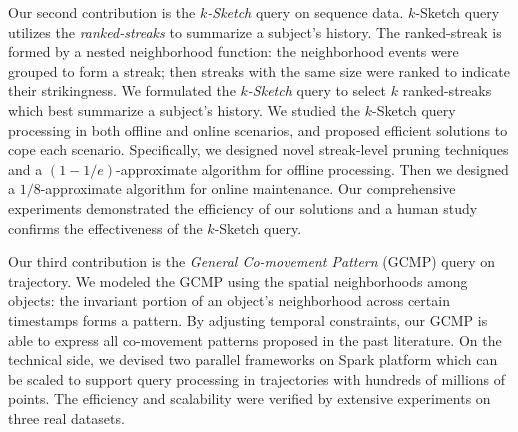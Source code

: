 Our second contribution is the \emph{$k$-Sketch} query on sequence data.
$k$-Sketch query utilizes the \emph{ranked-streaks} to
summarize a subject's history.
The ranked-streak is formed
by a nested neighborhood function: the neighborhood events were grouped to form a streak; then streaks with the same size were ranked to indicate their strikingness.
%
We formulated the \emph{$k$-Sketch} query to select $k$ ranked-streaks which best summarize a subject's history.
We studied the $k$-Sketch query processing in both offline and online scenarios,
and proposed efficient solutions to cope each scenario. Specifically, we designed novel streak-level pruning techniques and a $(1-1/e)$-approximate algorithm for offline processing. Then we designed a $1/8$-approximate algorithm for online maintenance.
Our comprehensive experiments demonstrated the efficiency of our solutions and a human study confirms the effectiveness of the $k$-Sketch query.


Our third contribution is the \emph{General Co-movement Pattern} (GCMP) query on trajectory.
We modeled the GCMP using the spatial neighborhoods among objects:
the invariant portion of an object's neighborhood across certain timestamps
forms a pattern.
By adjusting temporal constraints, our GCMP is able
to express all co-movement patterns proposed in the past literature.
% 
On the technical side, we  devised two parallel frameworks on Spark platform which can be scaled to 
support query processing in trajectories with hundreds of millions of points. 
The efficiency and scalability were verified by extensive experiments on three real datasets.
%
%
%
%
%
%


